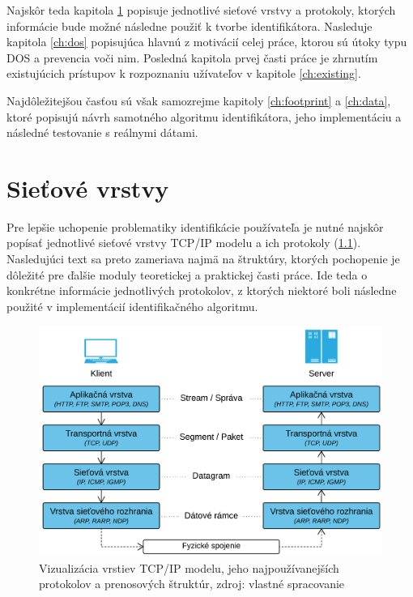 \documentclass[
  digital, %
  oneside, %
  table,   %
  lof,     %
  nolot,   %
  nocover
]{fithesis3}
\begin{document}
Najskôr teda kapitola
\ref{ch:net-layers} popisuje jednotlivé sieťové vrstvy a protokoly, ktorých
informácie bude možné následne použiť k tvorbe identifikátora. 
Nasleduje kapitola \ref{ch:dos} popisujúca hlavnú z motivácií 
celej práce, ktorou sú útoky typu DOS a prevencia voči nim.
Posledná kapitola prvej časti práce je zhrnutím
existujúcich prístupov k rozpoznaniu užívateľov v kapitole \ref{ch:existing}.

Najdôležitejšou časťou sú však
samozrejme kapitoly \ref{ch:footprint} a \ref{ch:data}, ktoré popisujú návrh samotného 
algoritmu identifikátora, jeho implementáciu a následné testovanie s reálnymi dátami.

\chapter{Sieťové vrstvy}
\label{ch:net-layers}
Pre lepšie uchopenie problematiky identifikácie používateľa je nutné najskôr
popísať jednotlivé sieťové vrstvy TCP/IP modelu a
ich protokoly (\ref{fig:net-layers}). Nasledujúci text sa preto zameriava najmä na štruktúry, ktorých pochopenie je
dôležité pre ďalšie moduly teoretickej a praktickej časti práce. Ide teda o
konkrétne informácie jednotlivých protokolov, z ktorých niektoré boli následne použité v implementácií
identifikačného algoritmu.

\begin{figure}[h]
  \centering
    \includegraphics[width=\textwidth]{images/net-layers.png}
  \caption{Vizualizácia vrstiev TCP/IP modelu, jeho najpoužívanejších protokolov
  a prenosových štruktúr, zdroj: vlastné spracovanie}
  \label{fig:net-layers}
\end{figure}
\end{document}
